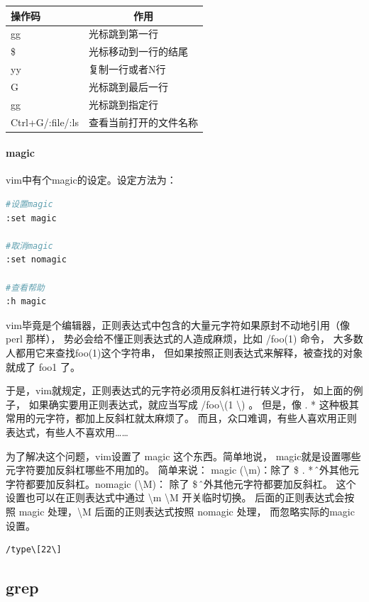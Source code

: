 \documentclass{book}
\begin{document}
\begin{tabular}{l|p{10cm}}
	\multirow{1}{*}{操作码}			
	& \multicolumn{1}{c}{作用}\\	 
	\hline
	gg & 光标跳到第一行\\
	\hline
	\$ & 光标移动到一行的结尾\\
	\hline
	[N]yy & 复制一行或者N行\\
	\hline
	G & 光标跳到最后一行\\
	\hline
	[n]gg & 光标跳到指定行\\
	\hline
	Ctrl+G/:file/:ls & 查看当前打开的文件名称\\
	\hline
\end{tabular}

\paragraph{magic}vim中有个magic的设定。设定方法为：

\begin{lstlisting}[language=Bash]
#设置magic
:set magic

#取消magic
:set nomagic

#查看帮助
:h magic
\end{lstlisting}

vim毕竟是个编辑器，正则表达式中包含的大量元字符如果原封不动地引用（像perl 那样）， 势必会给不懂正则表达式的人造成麻烦，比如 /foo(1) 命令， 大多数人都用它来查找foo(1)这个字符串， 但如果按照正则表达式来解释，被查找的对象就成了 foo1 了。

于是，vim就规定，正则表达式的元字符必须用反斜杠进行转义才行， 如上面的例子，
如果确实要用正则表达式，就应当写成 /foo\textbackslash (1 \textbackslash) 。 
但是，像 . * 这种极其常用的元字符，都加上反斜杠就太麻烦了。 
而且，众口难调，有些人喜欢用正则表达式，有些人不喜欢用……

为了解决这个问题，vim设置了 magic 这个东西。简单地说， magic就是设置哪些元字符要加反斜杠哪些不用加的。 
简单来说：
magic (\textbackslash m)：除了 \$ . * \^ 之外其他元字符都要加反斜杠。nomagic (\textbackslash M)：
除了 \$ \^ 之外其他元字符都要加反斜杠。
这个设置也可以在正则表达式中通过 \textbackslash m \textbackslash M 开关临时切换。 
\m 后面的正则表达式会按照 magic 处理，\textbackslash M 后面的正则表达式按照 nomagic 处理， 而忽略实际的magic设置。

\begin{lstlisting}[language=Bash]
/type\[22\]
\end{lstlisting}

\subsection{grep}
\end{document}
